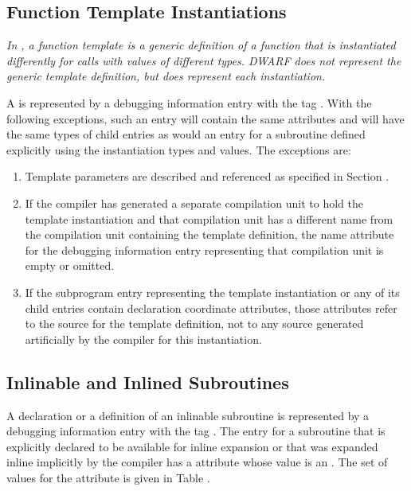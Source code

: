 \subsection{Function Template Instantiations}
\label{chap:functiontemplateinstantiations}

\textit{In , a function template is a generic definition of
a function that is instantiated differently for calls with
values of different types. DWARF does not represent the generic
template definition, but does represent each instantiation.}

A 
is represented by a debugging information entry with the
tag \DWTAGsubprogram.
With the following
exceptions, such an entry will contain the same attributes and
will have the same types of child entries as would an entry
for a subroutine defined explicitly using the instantiation
types and values. The exceptions are:

\begin{enumerate}[1. ]
\item Template parameters are described and referenced as specified in
Section .

\item If the compiler has generated a separate compilation unit
to hold the template instantiation and that compilation unit
has a different name from the compilation unit containing
the template definition, the name attribute for the debugging
information entry representing that compilation unit is empty
or omitted.

\item If the subprogram entry representing the template
instantiation or any of its child entries contain declaration
coordinate attributes, those attributes refer to the source
for the template definition, not to any source generated
artificially by the compiler for this instantiation.
\end{enumerate}


\subsection{Inlinable and Inlined Subroutines}
\label{chap:inlinedsubroutines}
A declaration or a definition of an inlinable subroutine
is represented by a debugging information entry with the
tag \DWTAGsubprogram.
The entry for a subroutine
that is\hypertarget{chap:DWATinlineinlinedsubroutine}{}
explicitly declared to be available for inline expansion or
that was expanded inline implicitly by the compiler has a
\DWATinlineDEFN{} attribute whose value is an
. The
set of values for the \DWATinline{} attribute is given in
Table .

